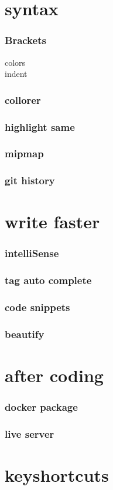 \documentclass{beamer}
\begin{document}
\section{syntax}
\begin{frame}
\frametitle{Brackets}
colors\\
indent\\
\end{frame}

\begin{frame}
\frametitle{collorer}
\end{frame}

\begin{frame}
\frametitle{highlight same}
\end{frame}

\begin{frame}
\frametitle{mipmap}
\end{frame}

\begin{frame}
\frametitle{git history}
\end{frame}


\section{write faster}
\begin{frame}
\frametitle{intelliSense}
\end{frame}

\begin{frame}
\frametitle{tag auto complete}
\end{frame}

\begin{frame}
\frametitle{code snippets}
\end{frame}

\begin{frame}
\frametitle{beautify}
\end{frame}


\section{after coding}
\begin{frame}
\frametitle{docker package}
\end{frame}

\begin{frame}
\frametitle{live server}
\end{frame}


\section{keyshortcuts}
\begin{frame}
\frametitle{}
\end{frame}
\end{document}
